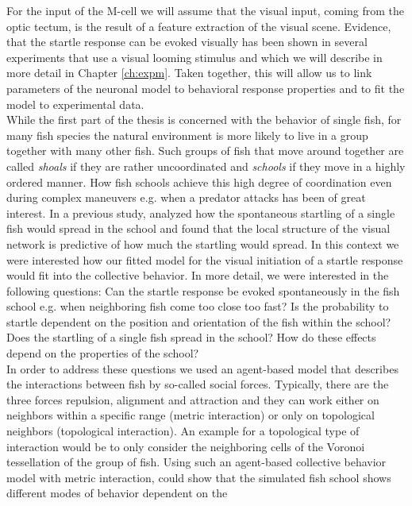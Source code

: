 \documentclass[a4paper,10pt,hidelinks]{scrreprt}
\begin{document}
	For the input of the M-cell we will assume that the visual input, coming from the optic tectum, 
	is the result of a feature extraction of the visual scene.
    Evidence, that the startle response can be evoked visually has been shown in several experiments that use a visual looming stimulus and which we will describe in more detail in Chapter \ref{ch:expm}.
	Taken together, this will allow us to link parameters of the neuronal model to behavioral 
	response properties and to fit the model to experimental data.\\
	While the first part of the thesis is concerned with the behavior of single fish, for many fish species the natural environment is more likely to live in a group together with many other fish.
	Such groups of fish that move around together are called \textit{shoals} if they are rather uncoordinated and \textit{schools} if they move in a highly ordered manner.
    How fish schools achieve this high degree of coordination even during complex maneuvers e.g. when a predator attacks has been of great interest.
    In a previous study, \cite{Rosenthal2015} analyzed how the spontaneous startling of a single fish would spread in the school and found that the local structure of the visual network is predictive of how much the startling would spread.
    In this context we were interested how our fitted model for the visual initiation of a startle response would fit into the collective behavior.
	In more detail, we were interested in the following questions:
	Can the startle response be evoked spontaneously in the fish school e.g. when neighboring fish 
	come too close too fast?
    Is the probability to startle dependent on the position and orientation of the fish within the school?
	Does the startling of a single fish spread in the school?
	How do these effects depend on the properties of the school?\\
	In order to address these questions we used an agent-based model that describes the 
	interactions between fish by so-called social forces.
	Typically, there are the three forces repulsion, alignment and attraction and they can work 
	either on neighbors within a specific range (metric interaction) or only on topological 
	neighbors (topological interaction).
	An example for a topological type of interaction would be to only consider the neighboring 
	cells of the Voronoi tessellation of the group of fish.
	Using such an agent-based collective behavior model with metric interaction, \cite{Couzin2002} 
	could show that the simulated fish school shows different modes of behavior dependent on the 
\end{document}
